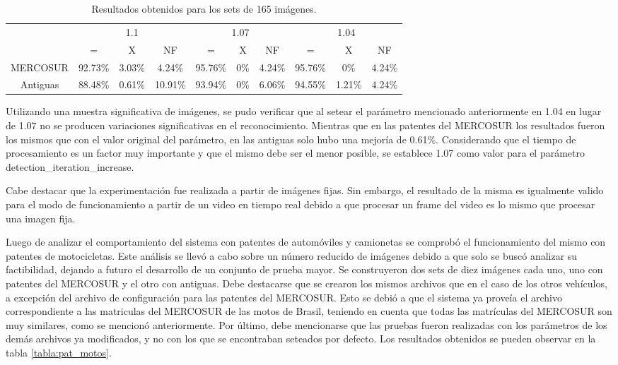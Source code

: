\begin{table}[htb]
	\centering
	\resizebox{14cm}{!} {
		\begin{tabular}{|c|c|c|c|c|c|c|c|c|c|}
			\hline
			& \multicolumn{3}{c|}{1.1} & \multicolumn{3}{c|}{1.07} & \multicolumn{3}{c|}{1.04}\\
			\cline{2-10}
			& = & X & NF & = & X & NF & = & X & NF\\
			\hline \hline
			MERCOSUR & 92.73\% & 3.03\% & 4.24\% & 95.76\% & 0\% & 4.24\% & 95.76\% & 0\% & 4.24\%\\ \hline
			Antiguas & 88.48\% & 0.61\% & 10.91\% & 93.94\% & 0\% & 6.06\% & 94.55\% & 1.21\% & 4.24\%\\ \hline
		\end{tabular}
	}
	\caption{Resultados obtenidos para los sets de 165 imágenes.}
	\label{tabla:openalpr_Tdesarrollado160}
\end{table}	
	
Utilizando una muestra significativa de imágenes, se pudo verificar que al setear el parámetro mencionado anteriormente en 1.04 en lugar de 1.07 no se producen variaciones significativas en el reconocimiento. Mientras que en las patentes del MERCOSUR los resultados fueron los mismos que con el valor original del parámetro, en las antiguas solo hubo una mejoría de 0.61\%. Considerando que el tiempo de procesamiento es un factor muy importante y que el mismo debe ser el menor posible, se establece 1.07 como valor para el parámetro detection\_iteration\_increase.	
	
Cabe destacar que la experimentación fue realizada a partir de imágenes fijas. Sin embargo, el resultado de la misma es igualmente valido para el modo de funcionamiento a partir de un video en tiempo real debido a que procesar un frame del video es lo mismo que procesar una imagen fija.	
	
Luego de analizar el comportamiento del sistema con patentes de automóviles y camionetas se comprobó el funcionamiento del mismo con patentes de motocicletas. Este análisis se llevó a cabo sobre un número reducido de imágenes debido a que solo se buscó analizar su factibilidad, dejando a futuro el desarrollo de un conjunto de prueba mayor. Se construyeron dos sets de diez imágenes cada uno, uno con patentes del MERCOSUR y el otro con antiguas. Debe destacarse que se crearon los mismos archivos que en el caso de los otros vehículos, a excepción del archivo de configuración para las patentes del MERCOSUR. Esto se debió a que el sistema ya proveía el archivo correspondiente a las matriculas del MERCOSUR de las motos de Brasil, teniendo en cuenta que todas las matrículas del MERCOSUR son muy similares, como se mencionó anteriormente. Por último, debe mencionarse que las pruebas fueron realizadas con los parámetros de los demás archivos ya modificados, y no con los que se encontraban seteados por defecto. Los resultados obtenidos se pueden observar en la tabla \ref{tabla:pat_motos}.
	
